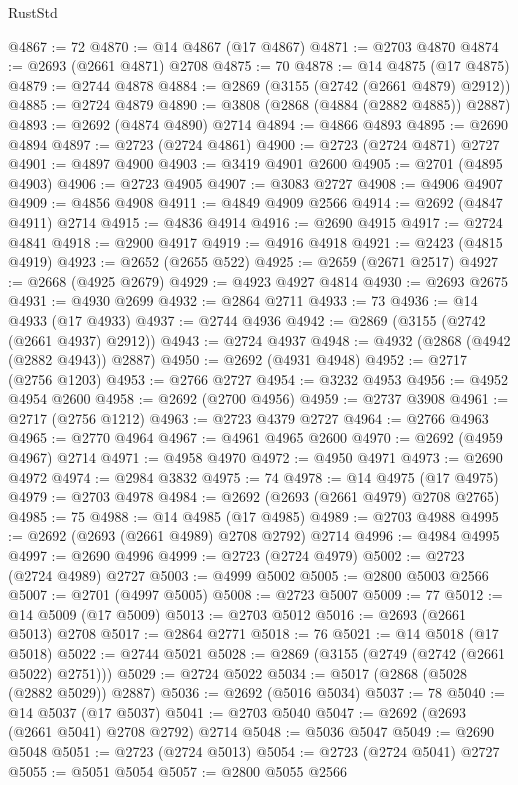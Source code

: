 \begin{lexlean}{RustStd}
\begin{coremodule}
@4867 := 72
@4870 := @14 @4867 (@17 @4867)
@4871 := @2703 @4870
@4874 := @2693 (@2661 @4871) @2708
@4875 := 70
@4878 := @14 @4875 (@17 @4875)
@4879 := @2744 @4878
@4884 := @2869 (@3155 (@2742 (@2661 @4879) @2912))
@4885 := @2724 @4879
@4890 := @3808 (@2868 (@4884 (@2882 @4885)) @2887)
@4893 := @2692 (@4874 @4890) @2714
@4894 := @4866 @4893
@4895 := @2690 @4894
@4897 := @2723 (@2724 @4861)
@4900 := @2723 (@2724 @4871) @2727
@4901 := @4897 @4900
@4903 := @3419 @4901 @2600
@4905 := @2701 (@4895 @4903)
@4906 := @2723 @4905
@4907 := @3083 @2727
@4908 := @4906 @4907
@4909 := @4856 @4908
@4911 := @4849 @4909 @2566
@4914 := @2692 (@4847 @4911) @2714
@4915 := @4836 @4914
@4916 := @2690 @4915
@4917 := @2724 @4841
@4918 := @2900 @4917
@4919 := @4916 @4918
@4921 := @2423 (@4815 @4919)
@4923 := @2652 (@2655 @522)
@4925 := @2659 (@2671 @2517)
@4927 := @2668 (@4925 @2679)
@4929 := @4923 @4927 @4814
@4930 := @2693 @2675
@4931 := @4930 @2699
@4932 := @2864 @2711
@4933 := 73
@4936 := @14 @4933 (@17 @4933)
@4937 := @2744 @4936
@4942 := @2869 (@3155 (@2742 (@2661 @4937) @2912))
@4943 := @2724 @4937
@4948 := @4932 (@2868 (@4942 (@2882 @4943)) @2887)
@4950 := @2692 (@4931 @4948)
@4952 := @2717 (@2756 @1203)
@4953 := @2766 @2727
@4954 := @3232 @4953
@4956 := @4952 @4954 @2600
@4958 := @2692 (@2700 @4956)
@4959 := @2737 @3908
@4961 := @2717 (@2756 @1212)
@4963 := @2723 @4379 @2727
@4964 := @2766 @4963
@4965 := @2770 @4964
@4967 := @4961 @4965 @2600
@4970 := @2692 (@4959 @4967) @2714
@4971 := @4958 @4970
@4972 := @4950 @4971
@4973 := @2690 @4972
@4974 := @2984 @3832
@4975 := 74
@4978 := @14 @4975 (@17 @4975)
@4979 := @2703 @4978
@4984 := @2692 (@2693 (@2661 @4979) @2708 @2765)
@4985 := 75
@4988 := @14 @4985 (@17 @4985)
@4989 := @2703 @4988
@4995 := @2692 (@2693 (@2661 @4989) @2708 @2792) @2714
@4996 := @4984 @4995
@4997 := @2690 @4996
@4999 := @2723 (@2724 @4979)
@5002 := @2723 (@2724 @4989) @2727
@5003 := @4999 @5002
@5005 := @2800 @5003 @2566
@5007 := @2701 (@4997 @5005)
@5008 := @2723 @5007
@5009 := 77
@5012 := @14 @5009 (@17 @5009)
@5013 := @2703 @5012
@5016 := @2693 (@2661 @5013) @2708
@5017 := @2864 @2771
@5018 := 76
@5021 := @14 @5018 (@17 @5018)
@5022 := @2744 @5021
@5028 := @2869 (@3155 (@2749 (@2742 (@2661 @5022) @2751)))
@5029 := @2724 @5022
@5034 := @5017 (@2868 (@5028 (@2882 @5029)) @2887)
@5036 := @2692 (@5016 @5034)
@5037 := 78
@5040 := @14 @5037 (@17 @5037)
@5041 := @2703 @5040
@5047 := @2692 (@2693 (@2661 @5041) @2708 @2792) @2714
@5048 := @5036 @5047
@5049 := @2690 @5048
@5051 := @2723 (@2724 @5013)
@5054 := @2723 (@2724 @5041) @2727
@5055 := @5051 @5054
@5057 := @2800 @5055 @2566

\end{coremodule}
\end{lexlean}
